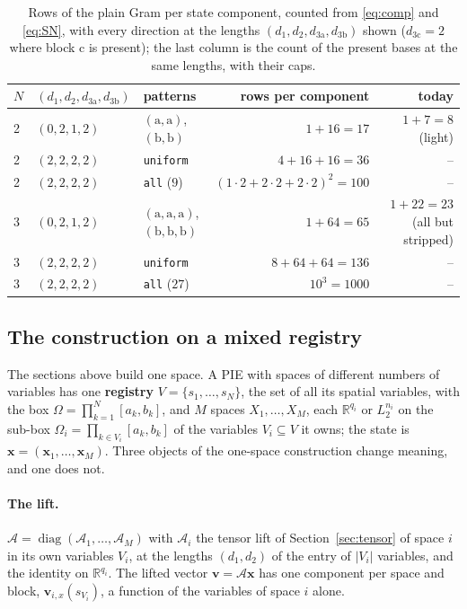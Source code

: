 \documentclass[12pt]{article}
\newcommand{\R}{\mathbb{R}}
\newcommand{\mcl}[1]{\mathcal{#1}}
\newcommand{\mbf}[1]{\mathbf{#1}}
\newcommand{\code}[1]{\texttt{#1}}
\newcommand{\ba}{\mathrm{a}}
\newcommand{\bb}{\mathrm{b}}
\newcommand{\bc}{\mathrm{c}}
\theoremstyle{plain}
\theoremstyle{definition}
\theoremstyle{remark}
\begin{document}
\begin{table}[h]\centering\footnotesize
\setlength{\tabcolsep}{5pt}
\begin{tabular}{lllrr}
\toprule
$N$ & $(d_1,d_2,d_{3\ba},d_{3\bb})$ & patterns & rows per component & today \\
\midrule
2 & $(0,2,1,2)$ & $(\ba,\ba)$, $(\bb,\bb)$ & $1+16=17$ & $1+7=8$ (light) \\
2 & $(2,2,2,2)$ & \code{uniform} & $4+16+16=36$ & -- \\
2 & $(2,2,2,2)$ & \code{all} ($9$) & $(1\cdot2+2\cdot2+2\cdot2)^2=100$ & -- \\
3 & $(0,2,1,2)$ & $(\ba,\ba,\ba)$, $(\bb,\bb,\bb)$ & $1+64=65$ & $1+22=23$ (all but stripped) \\
3 & $(2,2,2,2)$ & \code{uniform} & $8+64+64=136$ & -- \\
3 & $(2,2,2,2)$ & \code{all} ($27$) & $10^3=1000$ & -- \\
\bottomrule
\end{tabular}
\caption{Rows of the plain Gram per state component, counted from \eqref{eq:comp} and \eqref{eq:SN}, with every direction at the lengths $(d_1,d_2,d_{3\ba},d_{3\bb})$ shown ($d_{3\bc}=2$ where block $\bc$ is present); the last column is the count of the present bases at the same lengths, with their caps.}\label{tab:size}
\end{table}

\subsection{The construction on a mixed registry}\label{sec:mixed-construction}

The sections above build one space. A PIE with spaces of different numbers of variables has one \textbf{registry} $V=\{s_1,\dots,s_N\}$, the set of all its spatial variables, with the box $\Omega=\prod_{k=1}^N[a_k,b_k]$, and $M$ spaces $X_1,\dots,X_M$, each $\R^{q_i}$ or $L_2^{n_i}$ on the sub-box $\Omega_i=\prod_{k\in V_i}[a_k,b_k]$ of the variables $V_i\subseteq V$ it owns; the state is $\mbf x=(\mbf x_1,\dots,\mbf x_M)$. Three objects of the one-space construction change meaning, and one does not.

\paragraph{The lift.} $\mcl A=\operatorname{diag}(\mcl A_1,\dots,\mcl A_M)$ with $\mcl A_i$ the tensor lift of Section~\ref{sec:tensor} of space $i$ in its own variables $V_i$, at the lengths $(d_1,d_2)$ of the entry of $|V_i|$ variables, and the identity on $\R^{q_i}$. The lifted vector $\mbf v=\mcl A\mbf x$ has one component per space and block, $\mbf v_{i,x}(s_{V_i})$, a function of the variables of space $i$ alone.
\end{document}
